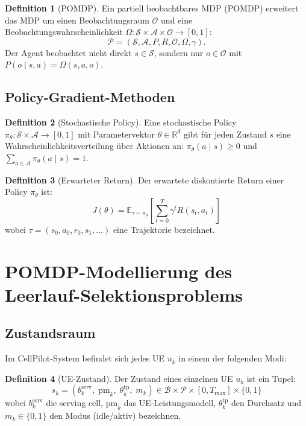 ﻿\documentclass[a4paper,12pt]{article}
\theoremstyle{definition}
\newtheorem{definition}{Definition}
\begin{document}
\begin{definition}[POMDP]
  Ein partiell beobachtbares MDP (POMDP) erweitert das MDP um einen
  Beobachtungsraum $\mathcal{O}$ und eine Beobachtungswahrscheinlichkeit
  $\Omega: \mathcal{S} \times \mathcal{A} \times \mathcal{O} \to [0,1]$:
  \[
    \mathcal{P} = (\mathcal{S}, \mathcal{A}, P, R, \mathcal{O}, \Omega, \gamma).
  \]
  Der Agent beobachtet nicht direkt $s \in \mathcal{S}$, sondern nur
  $o \in \mathcal{O}$ mit $P(o \mid s, a) = \Omega(s, a, o)$.
\end{definition}

\subsection{Policy-Gradient-Methoden}

\begin{definition}[Stochastische Policy]
  Eine stochastische Policy $\pi_\theta: \mathcal{S} \times \mathcal{A} \to [0,1]$
  mit Parametervektor $\theta \in \mathbb{R}^d$ gibt für jeden Zustand $s$
  eine Wahrscheinlichkeitsverteilung über Aktionen an:
  $\pi_\theta(a \mid s) \geq 0$ und $\sum_{a \in \mathcal{A}} \pi_\theta(a \mid s) = 1$.
\end{definition}

\begin{definition}[Erwarteter Return]
  Der erwartete diskontierte Return einer Policy $\pi_\theta$ ist:
  \[
    J(\theta) = \mathbb{E}_{\tau \sim \pi_\theta}\!\left[\sum_{t=0}^{T} \gamma^t R(s_t, a_t)\right]
  \]
  wobei $\tau = (s_0, a_0, r_0, s_1, \ldots)$ eine Trajektorie bezeichnet.
\end{definition}

\section{POMDP-Modellierung des Leerlauf-Selektionsproblems}
\label{sec:pomdp}

\subsection{Zustandsraum}

Im CellPilot-System befindet sich jedes UE $u_k$ in einem der folgenden Modi:

\begin{definition}[UE-Zustand]
  Der Zustand eines einzelnen UE $u_k$ ist ein Tupel:
  \[
    s_k = (b_k^{\mathrm{serv}},\; \mathrm{pm}_k,\; \theta_k^{\mathrm{tp}},\; m_k)
    \in \mathcal{B} \times \mathcal{P} \times [0, T_{\max}] \times \{0,1\}
  \]
  wobei $b_k^{\mathrm{serv}}$ die serving cell, $\mathrm{pm}_k$ das UE-Leistungsmodell,
  $\theta_k^{\mathrm{tp}}$ den Durchsatz und $m_k \in \{0,1\}$ den Modus (idle/aktiv) bezeichnen.
\end{definition}
\end{document}
